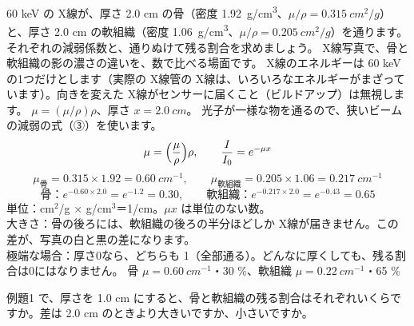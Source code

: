\label{ph:原-13:ex1}
\begin{phreidai}
60 keV の X線が、厚さ 2.0 cm の骨（密度 \qty{1.92}{g/cm^3}、$\mu/\rho=\qty{0.315}{cm^2/g}$）と、厚さ 2.0 cm の軟組織（密度 \qty{1.06}{g/cm^3}、$\mu/\rho=\qty{0.205}{cm^2/g}$）を通ります。それぞれの減弱係数と、通りぬけて残る割合を求めましょう。
\phbamen
X線写真で、骨と軟組織の影の濃さの違いを、数で比べる場面です。
\phmushi
X線のエネルギーは 60 keV の1つだけとします（実際の X線管の X線は、いろいろなエネルギーがまざっています）。向きを変えた X線がセンサーに届くこと（ビルドアップ）は無視します。
\phzu
$\mu=(\mu/\rho)\rho$、厚さ $x=\qty{2.0}{cm}$。
\phriyu
光子が一様な物を通るので、狭いビームの減弱の式（③）を使います。
\phtateru
\[ \mu=\Bigl(\frac{\mu}{\rho}\Bigr)\rho,\qquad \frac{I}{I_0}=e^{-\mu x} \]
\phtoku
\[ \mu_{\text{骨}}=0.315\times1.92=\qty{0.60}{cm^{-1}},\qquad \mu_{\text{軟組織}}=0.205\times1.06=\qty{0.217}{cm^{-1}} \]
\[ \text{骨：}e^{-0.60\times2.0}=e^{-1.2}=0.30,\qquad \text{軟組織：}e^{-0.217\times2.0}=e^{-0.43}=0.65 \]
\phtashikame
単位：cm$^2$/g × g/cm$^3$＝1/cm。$\mu x$ は単位のない数。\\
大きさ：骨の後ろには、軟組織の後ろの半分ほどしか X線が届きません。この差が、写真の白と黒の差になります。\\
極端な場合：厚さ0なら、どちらも 1（全部通る）。どんなに厚くしても、残る割合は0にはなりません。
\kotae 骨 $\mu=\qty{0.60}{cm^{-1}}$・30 \%、軟組織 $\mu=\qty{0.22}{cm^{-1}}$・65 \%
\end{phreidai}
\begin{jibun}
例題1 で、厚さを 1.0 cm にすると、骨と軟組織の残る割合はそれぞれいくらですか。差は 2.0 cm のときより大きいですか、小さいですか。
\end{jibun}

